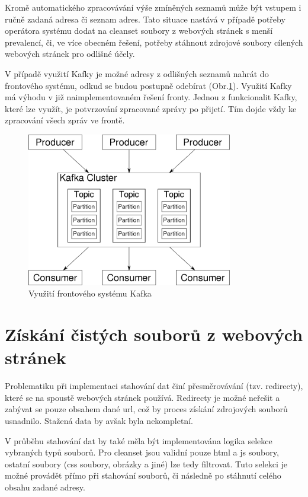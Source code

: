 \documentclass[thesis=M,czech,hidelinks]{FITthesis}[2013/05/06]
\begin{document}
Kromě automatického zpracovávání výše zmíněných seznamů může být vstupem i ručně zadaná adresa či seznam adres. Tato situace nastává v případě potřeby operátora systému dodat na cleanset soubory z webových stránek s menší prevalencí, či, ve více obecném řešení, potřeby stáhnout zdrojové soubory cílených webových stránek pro odlišné účely.

V případě využití Kafky je možné adresy z odlišných seznamů nahrát do frontového systému, odkud se budou postupně odebírat (Obr.\ref{fig:kafka_schema}). Využití Kafky má výhodu v již naimplementovaném řešení fronty. Jednou z funkcionalit Kafky, které lze využít, je potvrzování zpracované zprávy po přijetí. Tím dojde vždy ke zpracování všech zpráv ve frontě. 

\begin{figure}[h]
	\centering
	\includegraphics[width=9cm]{pictures/kafka.png}
	\caption{Využití frontového systému Kafka}
	\label{fig:kafka_schema}
\end{figure}




\section{Získání čistých souborů z webových stránek}
Problematiku při implementaci stahování dat činí přesměrovávání (tzv. redirecty), které se na spoustě webových stránek používá. Redirecty je možné neřešit a zabývat se pouze obsahem dané url, což by proces získání zdrojových souborů usnadnilo. Stažená data by avšak byla nekompletní.

V průběhu stahování dat by také měla být implementována logika selekce vybraných typů souborů. Pro cleanset jsou validní pouze html a js soubory, ostatní soubory (css soubory, obrázky a jiné) lze tedy filtrovat. Tuto selekci je možné provádět přímo při stahování souborů, či následně po stáhnutí celého obsahu zadané adresy.
\end{document}
